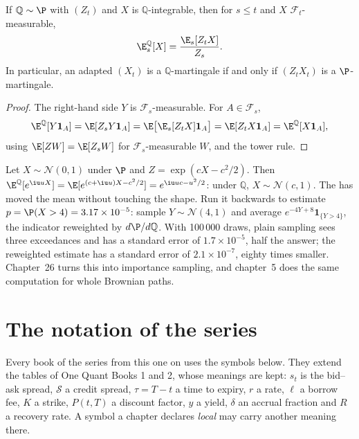 \begin{proposition}\label{prop:qm:probability-at-speed:bayes}
If $\mathbb Q \sim \P$ with  $(Z_t)$ and $X$ is $\mathbb Q$-integrable, then
for $s \le t$ and $X$ $\mathcal F_t$-measurable,
\[
\E^{\mathbb Q}_s[X] = \frac{\E_s[Z_tX]}{Z_s}.
\]
In particular, an adapted $(X_t)$ is a $\mathbb Q$-martingale if and only if $(Z_tX_t)$ is a
$\P$-martingale.
\end{proposition}

\begin{proof}
The right-hand side $Y$ is $\mathcal F_s$-measurable. For $A \in \mathcal F_s$,
\[
\E^{\mathbb Q}[Y\mathbf 1_A] = \E[Z_sY\mathbf 1_A] = \E\bigl[\E_s[Z_tX]\mathbf 1_A\bigr] =
\E[Z_tX\mathbf 1_A] = \E^{\mathbb Q}[X\mathbf 1_A],
\]
using $\E[Z W] = \E[Z_s W]$ for $\mathcal F_s$-measurable $W$, and the tower rule.
\end{proof}

\begin{example}\label{ex:qm:probability-at-speed:shift}
Let $X \sim \mathcal N(0, 1)$ under $\P$ and $Z = \exp(cX - c^2/2)$. Then $\E^{\mathbb
Q}[e^{\iu uX}] = \E[e^{(c + \iu u)X - c^2/2}] = e^{\iu uc - u^2/2}$: under $\mathbb Q$, $X \sim
\mathcal N(c, 1)$. The  has moved the mean without touching the shape. Run it
backwards to estimate $p = \P(X > 4) = 3.17 \times 10^{-5}$: sample $Y \sim \mathcal N(4, 1)$
and average $e^{-4Y + 8}\mathbf 1_{\{Y > 4\}}$, the indicator reweighted by $d\P/d\mathbb Q$.
With 100\,000 draws, plain sampling sees three exceedances and has a standard error of $1.7
\times 10^{-5}$, half the answer; the reweighted estimate has a standard error of $2.1 \times
10^{-7}$, eighty times smaller. Chapter~26 turns this into importance sampling, and chapter~5
does the same computation for whole Brownian paths.
\end{example}

\section{The notation of the series}\label{sec:qm:probability-at-speed:notation}

Every book of the series from this one on uses the symbols below. They extend the tables of
One Quant Books 1 and 2, whose meanings are kept: $s_t$ is the bid--ask spread, $\mathcal S$
a credit spread, $\tau = T - t$ a time to expiry, $r$ a rate, $\ell$ a borrow fee, $K$ a
strike, $P(t,T)$ a discount factor, $y$ a yield, $\delta$ an accrual fraction and $R$ a
recovery rate. A symbol a chapter declares \emph{local} may carry another meaning there.

